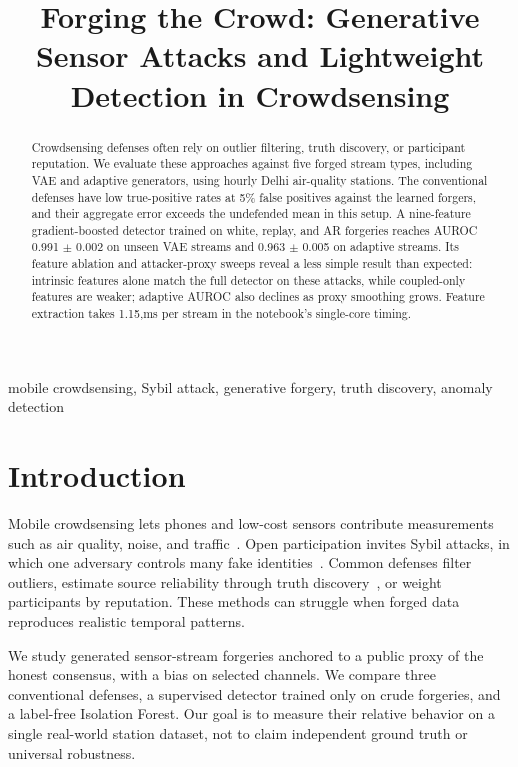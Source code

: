 \documentclass[conference]{IEEEtran}
\begin{document}
\title{Forging the Crowd: Generative Sensor Attacks and Lightweight Detection in Crowdsensing}
\author{
}
\maketitle
\begin{abstract}
Crowdsensing defenses often rely on outlier filtering, truth discovery, or participant reputation. We evaluate these approaches against five forged stream types, including VAE and adaptive generators, using hourly Delhi air-quality stations. The conventional defenses have low true-positive rates at 5\% false positives against the learned forgers, and their aggregate error exceeds the undefended mean in this setup. A nine-feature gradient-boosted detector trained on white, replay, and AR forgeries reaches AUROC 0.991 $\pm$ 0.002 on unseen VAE streams and 0.963 $\pm$ 0.005 on adaptive streams. Its feature ablation and attacker-proxy sweeps reveal a less simple result than expected: intrinsic features alone match the full detector on these attacks, while coupled-only features are weaker; adaptive AUROC also declines as proxy smoothing grows. Feature extraction takes 1.15,ms per stream in the notebook's single-core timing.
\end{abstract}
\begin{IEEEkeywords}
mobile crowdsensing, Sybil attack, generative forgery, truth discovery, anomaly detection
\end{IEEEkeywords}
\section{Introduction}
Mobile crowdsensing lets phones and low-cost sensors contribute measurements such as air quality, noise, and traffic~\cite{ganti2011}. Open participation invites Sybil attacks, in which one adversary controls many fake identities~\cite{douceur2002}. Common defenses filter outliers, estimate source reliability through truth discovery~\cite{li2014crh,li2016survey}, or weight participants by reputation. These methods can struggle when forged data reproduces realistic temporal patterns.

We study generated sensor-stream forgeries anchored to a public proxy of the honest consensus, with a bias on selected channels. We compare three conventional defenses, a supervised detector trained only on crude forgeries, and a label-free Isolation Forest. Our goal is to measure their relative behavior on a single real-world station dataset, not to claim independent ground truth or universal robustness.
\end{document}
